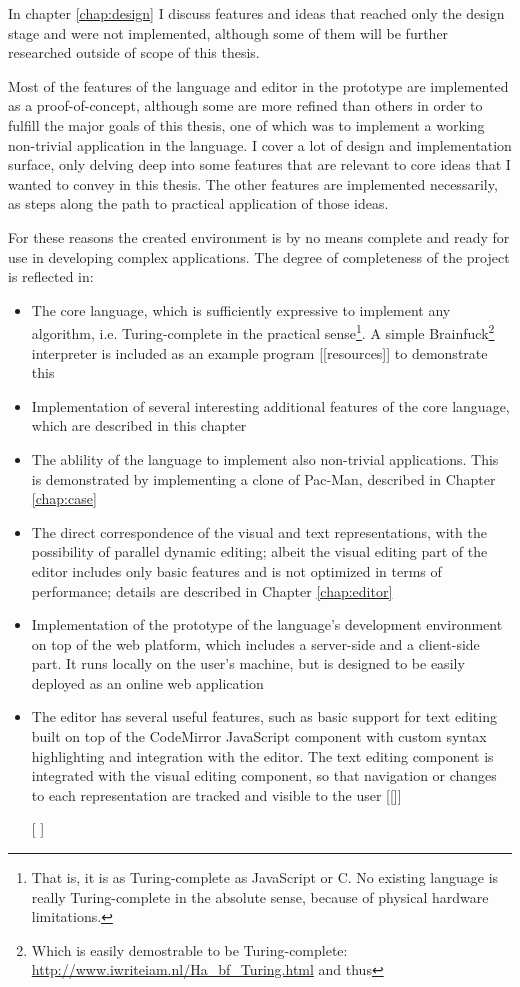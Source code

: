 In chapter \ref{chap:design} I discuss features and ideas that reached only the
design stage and were not implemented, although some of them will be further
researched outside of scope of this thesis.

Most of the features of the language and editor in the prototype are implemented
as a proof-of-concept, although some are more refined than others in order to
fulfill the major goals of this thesis, one of which was to implement a working
non-trivial application in the language. I cover a lot of design and
implementation surface, only delving deep into some features that are relevant
to core ideas that I wanted to convey in this thesis. The other features are
implemented necessarily, as steps along the path to practical application of
those ideas.

For these reasons the created environment is by no means complete and ready for
use in developing complex applications. The degree of completeness of the
project is reflected in:
\begin{itemize}
    \item The core language, which is sufficiently expressive to implement any
      algorithm, i.e. Turing-complete in the practical sense\footnote{That is,
        it is as Turing-complete as JavaScript or C. No existing language is
        really Turing-complete in the absolute sense, because of physical
        hardware limitations.}. A simple Brainfuck\footnote{Which is easily
        demostrable to be Turing-complete:
        \url{http://www.iwriteiam.nl/Ha_bf_Turing.html} and thus} interpreter is
      included as an example program [[resources]] to demonstrate this
    \item Implementation of several interesting additional features of the core
      language, which are described in this chapter 
    \item The ablility of the language to implement also non-trivial
      applications. This is demonstrated by implementing a clone of Pac-Man,
      described in Chapter \ref{chap:case}
    \item The direct correspondence of the visual and text representations, with
      the possibility of parallel dynamic editing; albeit the visual editing
      part of the editor includes only basic features and is not optimized in
      terms of performance; details are described in Chapter \ref{chap:editor}
    \item Implementation of the prototype of the language's development
      environment on top of the web platform, which includes a server-side and a
      client-side part. It runs locally on the user's machine, but is designed
      to be easily deployed as an online web application
    \item The editor has several useful features, such as basic support for text
      editing built on top of the CodeMirror JavaScript component with custom
      syntax highlighting and integration with the editor. The text editing
      component is integrated with the visual editing component, so that
      navigation or changes to each representation are tracked and visible to
      the user [[]]
    \item [[]]
\end{itemize}

